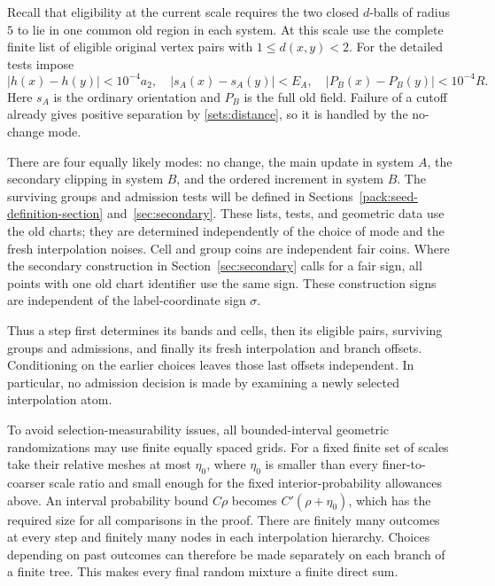 Recall that eligibility at the current scale requires the two closed
$d$-balls of radius $5$ to lie in one common old region in each system.
At this scale use the complete finite list
of eligible original vertex pairs with $1\le d(x,y)<2$. For the detailed
tests impose
\begin{equation}\label{sets:cutoffs}
 |h(x)-h(y)|<10^{-4}a_2,\quad
 |s_A(x)-s_A(y)|<E_A,\quad
 |P_B(x)-P_B(y)|<10^{-4}R.
\end{equation}
Here $s_A$ is the ordinary orientation and $P_B$ is the full old field.
Failure of a cutoff already gives positive separation by
\eqref{sets:distance}, so it is handled by the no-change mode.

There are four equally likely modes: no change, the main update in system
$A$, the secondary clipping in system $B$, and the ordered increment in
system $B$. The surviving groups and admission tests will be defined in
Sections~\ref{pack:seed-definition-section} and~\ref{sec:secondary}.
These lists, tests, and geometric data use the old charts; they are
determined independently of the choice of mode and the
fresh interpolation noises. Cell and group coins are independent fair
coins. Where the secondary construction in Section~\ref{sec:secondary} calls
for a fair sign, all points with one old chart identifier use the same
sign. These construction signs are independent of the label-coordinate
sign $\sigma$.

Thus a step first determines its bands and cells, then its eligible pairs,
surviving groups and admissions, and finally its fresh interpolation and
branch offsets. Conditioning on the earlier choices leaves those last
offsets independent. In particular, no admission decision is made by
examining a newly selected interpolation atom.

To avoid selection-measurability issues, all bounded-interval geometric
randomizations may use finite equally spaced grids. For a fixed finite
set of scales take their relative meshes at most $\eta_0$, where $\eta_0$
is smaller than every finer-to-coarser scale ratio and small enough for
the fixed interior-probability allowances above. An interval probability
bound $C\rho$ becomes $C'(\rho+\eta_0)$, which has the required size for
all comparisons in the proof. There are finitely many outcomes at every
step and finitely many nodes in each interpolation hierarchy. Choices
depending on past outcomes can therefore be made separately on each branch
of a finite tree. This makes every final random mixture a finite direct sum.
